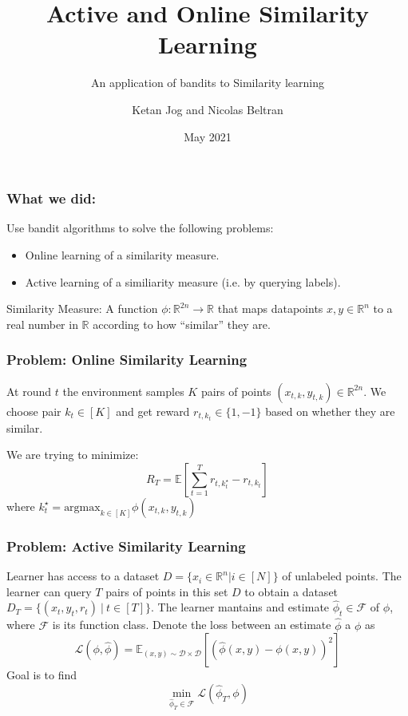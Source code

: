 \documentclass{beamer}
\title[Similarity Learning]{Active and Online Similarity Learning}
\subtitle[]{An application of bandits to Similarity learning}
\author[Ketan and Nicolas]{Ketan Jog and Nicolas Beltran}
\institute[]{Columbia University}
\date{May 2021}
\begin{document}
\begin{frame}
    \titlepage
\end{frame}


\begin{frame}{}
\frametitle{What we did:}
Use bandit algorithms to solve the following problems:
\begin{itemize}
\item
    Online learning of a similarity measure.
\item
    Active learning of a similiarity measure (i.e. by querying labels).
\end{itemize}
\vspace*{1cm}
\begin{definition}
Similarity Measure: A function $\phi: \mathbb{R}^{2n} \to \mathbb{R}$ that maps datapoints $x, y \in \mathbb{R}^{n}$ to a real number in $\mathbb{R}$
according to how ``similar'' they are.
\end{definition}
\end{frame}


\begin{frame}{}
    \frametitle{Problem: Online Similarity Learning}
    At round $t$ the environment samples $K$ pairs of points $(x_{t,k}, y_{t,k}) \in \mathbb{R}^{2n}$.
    We choose pair $k_t \in [K]$ and get reward $r_{t,k_{t}} \in \{1, -1\}$ based on whether they are similar.

    We are trying to minimize:
    \[ R_T = \mathbb{E}\left[\sum_{t =1}^T r_{t, k^\star_t} - r_{t, k_t}\right] \]
    where $k_t^\star = \text{argmax}_{k\in [K]} \phi(x_{t,k}, y_{t,k})$
\end{frame}

\begin{frame}{}
    \frametitle{Problem: Active Similarity Learning}
    Learner has access to a dataset $D = \{x_i \in \mathbb{R}^n| i \in [N]\}$ of unlabeled points.
    The learner can query $T$ pairs of points in this set $D$ to obtain a dataset $D_T = \{(x_t, y_t, r_t) ~|  ~t \in [T]\}$.
    The learner mantains and estimate $\hat{\phi}_t \in \mathcal{F}$ of $\phi$, where $\mathcal{F}$ is its function class.
    Denote the loss between an estimate $\hat{\phi}$ a $\phi$ as
    \[ \mathcal{L}(\phi, \hat{\phi}) = \mathbb{E}_{(x, y) \sim \mathcal{D} \times \mathcal{D}}[(\hat{\phi}(x,y) - \phi(x, y))^2] \]
    Goal is to find
    \[\min_{\hat{\phi}_T \in \mathcal{F}} \mathcal{L}(\hat{\phi}_T, \phi)\]
\end{frame}
\end{document}
